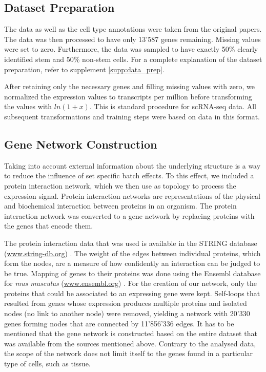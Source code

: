 \documentclass[10pt,conference,compsocconf]{IEEEtran}
\begin{document}
\subsection{Dataset Preparation}
The data as well as the cell type annotations were taken from the original papers. The data was then processed to have only 13'587 genes remaining. Missing values were set to zero. Furthermore, the data was sampled to have exactly 50\% clearly identified stem and 50\% non-stem cells. For a complete explanation of the dataset preparation, refer to supplement \ref{supp:data_prep}.
\par
After retaining only the necessary genes and filling missing values with zero, we normalized the expression values to transcripts per million before transforming the values with $ln(1+x)$. This is standard procedure for scRNA-seq data. All subsequent transformations and training steps were based on data in this format. 

\subsection{Gene Network Construction}
Taking into account external information about the underlying structure is a way to reduce the influence of set specific batch effects. To this effect, we included a protein interaction network, which we then use as topology to process the expression signal. Protein interaction networks are representations of the physical and biochemical interaction between proteins in an organism. The protein interaction network was converted to a gene network by replacing proteins with the genes that encode them. 
\par
The protein interaction data that was used is available in the STRING database (\url{www.string-db.org}) \cite{Szklarczyk2016}. The weight of the edges between individual proteins, which form the nodes, are a measure of how confidently an interaction can be judged to be true. Mapping of genes to their proteins was done using the Ensembl database for \textit{mus musculus} (\url{www.ensembl.org}) \cite{Zerbino2017}. 
For the creation of our network, only the proteins that could be associated to an expressing gene were kept.
Self-loops that resulted from genes whose expression produces multiple proteins and isolated nodes (no link to another node) were removed, yielding a network with 20'330 genes forming nodes that are connected by 11'856'336 edges. It has to be mentioned that the gene network is constructed based on the entire dataset that was available from the sources mentioned above. Contrary to the analysed data, the scope of the network does not limit itself to the genes found in a particular type of cells, such as tissue.  \\
\end{document}
